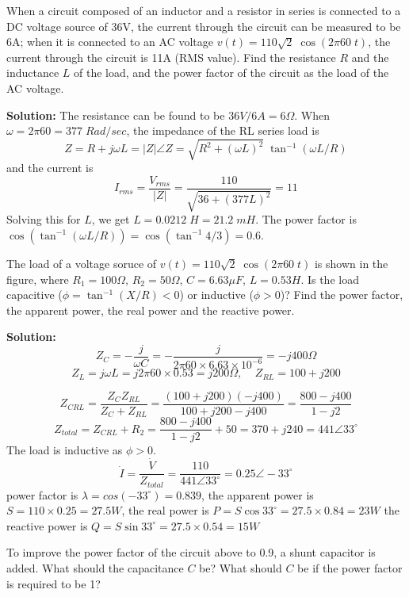 \item When a circuit composed of an inductor and a resistor in series
is connected to a DC voltage source of 36V, the current through the 
circuit can be measured to be 6A; when it is connected to an AC voltage 
$v(t)=110 \sqrt{2}\;\cos(2\pi 60\;t)$, the current through the circuit 
is 11A (RMS value). Find the resistance $R$ and the inductance $L$
of the load, and the power factor of the circuit as the load of the AC
voltage. 

{\bf Solution:} The resistance can be found to be $36V/6A=6\Omega$.
When $\omega=2\pi 60=377\;Rad/sec$, the impedance of the RL series load 
is 
\[ Z=R+j\omega L=|Z|\angle Z=\sqrt{R^2+( \omega L)^2}\;\tan^{-1} (\omega L/R) \]
and the current is
\[ I_{rms}=\frac{V_{rms}}{|Z|}=\frac{110}{\sqrt{36+(377 L)^2}}=11 \]
Solving this for $L$, we get $L=0.0212\;H=21.2\;mH$. The power factor is
$\cos (\tan^{-1} (\omega L/R))=\cos (\tan^{-1} 4/3)=0.6$.

\item The load of a voltage soruce of $v(t)=110\sqrt{2} \;\cos(2\pi 60\;t)$
is shown in the figure, where $R_1=100\Omega$, $R_2=50\Omega$, $C=6.63\mu F$, 
$L=0.53 H$. Is the load capacitive ($\phi=\tan^{-1}(X/R)<0$) or inductive 
($\phi>0$)? Find the power factor, the apparent power, the real power and 
the reactive power. 


 {\bf Solution:}
 \[ Z_C=-\frac{j}{\omega C}=-\frac{j}{2\pi 60\times 6.63\times 10^{-6}}
 	=-j400\Omega\]
 \[Z_L=j\omega L=j 2\pi 60\times 0.53=j200\Omega,\;\;\;\; Z_{RL}=100+j200\]
 
 \[ Z_{CRL}=\frac{Z_C Z_{RL}}{Z_C+Z_{RL}}=\frac{(100+j200)(-j400)}{100+j200-j400}
 	=\frac{800-j400}{1-j2}	\]
 \[
 Z_{total}=Z_{CRL}+R_2=\frac{800-j400}{1-j2}+50=370+j240=441\angle 33^\circ
 \]
 The load is inductive as $\phi>0$.
 \[ \dot{I}=\frac{\dot{V}}{Z_{total}}=\frac{110}{441\angle 33^\circ}
 	=0.25\angle -33^\circ	\]
 power factor is $\lambda=cos (-33^\circ)=0.839$, 
 the apparent power is $S=110\times 0.25=27.5 W$, 
 the real power is $P=S \cos 33^\circ=27.5\times 0.84=23 W$
 the reactive power is $Q=S \sin 33^\circ=27.5\times 0.54=15 W$

\item To improve the power factor of the circuit above to 0.9, a shunt 
capacitor is added. What should the capacitance $C$ be? What should $C$ be 
if the power factor is required to be 1?


